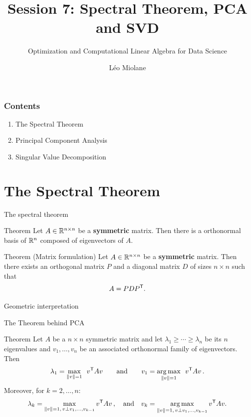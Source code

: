\documentclass{beamer}
\title{Session 7: Spectral Theorem, PCA and SVD}
\subtitle{Optimization and Computational Linear Algebra for Data Science}
\author{Léo Miolane}
\date{}
\begin{document}
\setcounter{showProgressBar}{0}
\setcounter{showSlideNumbers}{0}

\frame{\titlepage}

\begin{frame}
	\frametitle{Contents}
	\begin{enumerate}
		\item The Spectral Theorem
		\item Principal Component Analysis
		\item Singular Value Decomposition
	\end{enumerate}
\end{frame}


\setcounter{framenumber}{0}
\setcounter{showSlideNumbers}{1}

\section{The Spectral Theorem}

\begin{frame}[t]{The spectral theorem}
	\grid

	\vspace{-0.3cm}
	\begin{block}{Theorem}
		Let $A \in \mathbb{R}^{n \times n}$ be a \textbf{symmetric} matrix. Then there is a orthonormal basis of $\mathbb{R}^n$ composed of eigenvectors of $A$.
	\end{block}

	\vspace{2.7cm}
	\begin{block}{Theorem (Matrix formulation)}
		Let $A \in \mathbb{R}^{n \times n}$ be a \textbf{symmetric} matrix. Then there exists an orthogonal matrix $P$ and a diagonal matrix $D$ of sizes $n \times n$ such that
		$$
		A = P D P^{{\sf T}}.
		$$
	\end{block}
\end{frame}

\begin{frame}[t]{Geometric interpretation}
	\grid

\end{frame}

\begin{frame}[t]{The Theorem behind PCA}
	\grid

	\vspace{-0.3cm}
	\begin{block}{Theorem}
		Let $A$ be a $n \times n$ symmetric matrix and let $\lambda_1 \geq \cdots \geq \lambda_n$ be its $n$ eigenvalues and $v_1, \dots, v_n$ be an associated orthonormal family of eigenvectors. Then 
		$$
		\lambda_1 = \max_{\|v\| = 1}\ \, v^{{\sf T}} A v
		\qquad \text{and} \qquad
		v_1 = \operatorname*{arg\,max}_{\|v\| = 1}\ \, v^{{\sf T}} A v\,.
		$$
		Moreover, for $k=2,\dots,n$:
		$$
		\lambda_{k} = \max_{\|v\| = 1, \, v \perp v_1, \dots, v_{k-1}} v^{{\sf T}} A v\,,
		\quad \text{and} \quad
		v_{k} = \operatorname*{arg\,max}_{\|v\| = 1, \, v \perp v_1, \dots, v_{k-1}} v^{{\sf T}} A v.
		$$
	\end{block}
\end{frame}
\end{document}
